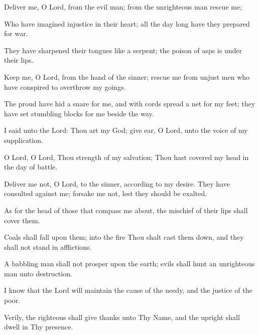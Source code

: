 Deliver me, O Lord, from the evil man; from the unrighteous man rescue me;

Who have imagined injustice in their heart; all the day long have they prepared for war.

They have sharpened their tongues like a serpent; the poison of asps is under their lips.

Keep me, O Lord, from the hand of the sinner; rescue me from unjust men who have conspired to overthrow my goings.

The proud have hid a snare for me, and with cords spread a net for my feet; they have set stumbling blocks for me beside the way.

I said unto the Lord: Thou art my God; give ear, O Lord, unto the voice of my supplication.

O Lord, O Lord, Thou strength of my salvation; Thou hast covered my head in the day of battle.

Deliver me not, O Lord, to the sinner, according to my desire. They have consulted against me; forsake me not, lest they should be exalted.

As for the head of those that compass me about, the mischief of their lips shall cover them.

Coals shall fall upon them; into the fire Thou shalt cast them down, and they shall not stand in afflictions.

A babbling man shall not prosper upon the earth; evils shall hunt an unrighteous man unto destruction.

I know that the Lord will maintain the cause of the needy, and the justice of the poor.

Verily, the righteous shall give thanks unto Thy Name, and the upright shall dwell in Thy presence.
